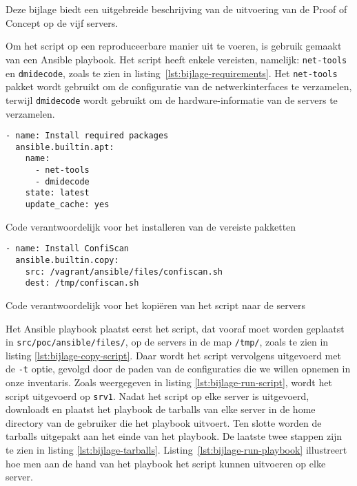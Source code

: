 
\chapter{}
\label{ch:bijlage_poc_uitvoering}

Deze bijlage biedt een uitgebreide beschrijving van de uitvoering van de Proof of Concept op de vijf servers.

Om het script op een reproduceerbare manier uit te voeren, is gebruik gemaakt van een Ansible playbook.
Het script heeft enkele vereisten, namelijk: \texttt{net-tools} en \texttt{dmidecode}, zoals te zien in listing~\ref{lst:bijlage-requirements}.
Het \texttt{net-tools} pakket wordt gebruikt om de configuratie van de netwerkinterfaces te verzamelen, terwijl \texttt{dmidecode} wordt gebruikt om de hardware-informatie van de servers te verzamelen.

\begin{listing}
  \begin{verbatim}
- name: Install required packages
  ansible.builtin.apt:
    name:
      - net-tools
      - dmidecode
    state: latest
    update_cache: yes
  \end{verbatim}
  \caption[Installatie van vereiste pakketten.]{Code verantwoordelijk voor het installeren van de vereiste pakketten}
  \label{lst:bijlage-requirements}
\end{listing}

\begin{listing}
  \begin{verbatim}
- name: Install ConfiScan
  ansible.builtin.copy:
    src: /vagrant/ansible/files/confiscan.sh
    dest: /tmp/confiscan.sh
  \end{verbatim}
  \caption[Kopi\"{e}ren van script naar servers.]{Code verantwoordelijk voor het kopiëren van het script naar de servers}
  \label{lst:bijlage-copy-script}
\end{listing}

Het Ansible playbook plaatst eerst het script, dat vooraf moet worden geplaatst in \texttt{src/poc/ansible/files/}, op de servers in de map \texttt{/tmp/}, zoals te zien in listing \ref{lst:bijlage-copy-script}.
Daar wordt het script vervolgens uitgevoerd met de \texttt{-t} optie, gevolgd door de paden van de configuraties die we willen opnemen in onze inventaris.
Zoals weergegeven in listing \ref{lst:bijlage-run-script}, wordt het script uitgevoerd op \texttt{srv1}.
Nadat het script op elke server is uitgevoerd, downloadt en plaatst het playbook de tarballs van elke server in de home directory van de gebruiker die het playbook uitvoert.
Ten slotte worden de tarballs uitgepakt aan het einde van het playbook.
De laatste twee stappen zijn te zien in listing \ref{lst:bijlage-tarballs}.
Listing~\ref{lst:bijlage-run-playbook} illustreert hoe men aan de hand van het playbook het script kunnen uitvoeren op elke server.

